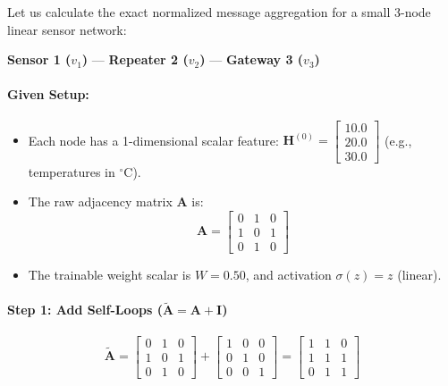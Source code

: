 \begin{example}
Let us calculate the exact normalized message aggregation for a small 3-node linear sensor network:
\begin{center}
\textbf{Sensor 1 ($v_1$)} --- \textbf{Repeater 2 ($v_2$)} --- \textbf{Gateway 3 ($v_3$)}
\end{center}

\paragraph{Given Setup:}
\begin{itemize}
    \item Each node has a 1-dimensional scalar feature: $\mathbf{H}^{(0)} = \begin{bmatrix} 10.0 \\ 20.0 \\ 30.0 \end{bmatrix}$ (e.g., temperatures in $^\circ\text{C}$).
    \item The raw adjacency matrix $\mathbf{A}$ is:
    \begin{equation*}
    \mathbf{A} = \begin{bmatrix} 
    0 & 1 & 0 \\ 
    1 & 0 & 1 \\ 
    0 & 1 & 0 
    \end{bmatrix}
    \end{equation*}
    \item The trainable weight scalar is $W = 0.50$, and activation $\sigma(z) = z$ (linear).
\end{itemize}

\paragraph{Step 1: Add Self-Loops ($\mathbf{\tilde{A}} = \mathbf{A} + \mathbf{I}$)}
\begin{equation*}
\mathbf{\tilde{A}} = \begin{bmatrix} 0 & 1 & 0 \\ 1 & 0 & 1 \\ 0 & 1 & 0 \end{bmatrix} + \begin{bmatrix} 1 & 0 & 0 \\ 0 & 1 & 0 \\ 0 & 0 & 1 \end{bmatrix} = \begin{bmatrix} 1 & 1 & 0 \\ 1 & 1 & 1 \\ 0 & 1 & 1 \end{bmatrix}
\end{equation*}


\end{example}
